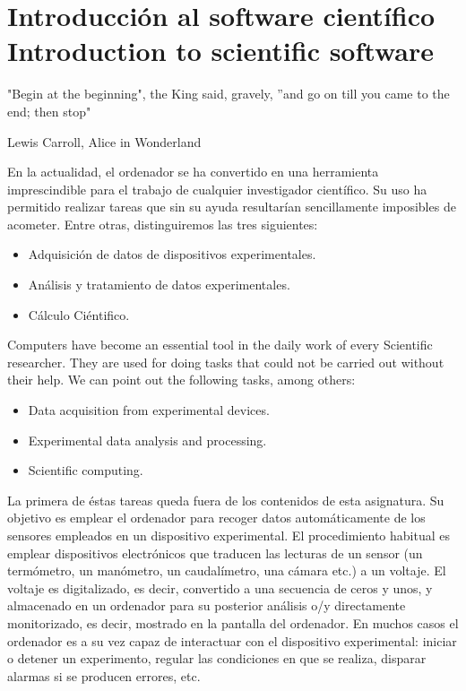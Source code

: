 \chapter{Introducción al software científico\\ Introduction to scientific software}\label{ch1}
\epigraph{"Begin at the beginning", the King said, gravely, ''and go on till you came to the end; then stop"}{Lewis Carroll, Alice in Wonderland}
\begin{paracol}{2}
En la actualidad, el ordenador se ha convertido en una herramienta imprescindible para el trabajo de cualquier investigador científico. Su uso ha permitido realizar tareas que sin su ayuda resultarían sencillamente imposibles de acometer. Entre otras, distinguiremos las tres siguientes:
\begin{itemize}
\item Adquisición de datos de dispositivos experimentales.
\item Análisis y tratamiento de datos experimentales. 
\item Cálculo Ciéntifico.
\end{itemize}
\switchcolumn
Computers have become an essential tool in the daily work of every Scientific researcher. They are used for doing tasks that could not be carried out without their help. We can point out the following tasks, among others:
 \begin{itemize}
\item Data acquisition from experimental devices.
\item Experimental data analysis and processing. 
\item Scientific computing.
\end{itemize}     


\switchcolumn
La primera de éstas tareas queda fuera de los contenidos de esta asignatura. Su objetivo es emplear el ordenador para recoger datos automáticamente de los sensores empleados en un dispositivo experimental. El procedimiento habitual es emplear dispositivos electrónicos que traducen las lecturas de un sensor (un termómetro, un manómetro, un caudalímetro, una cámara etc.) a un voltaje. El voltaje es digitalizado, es decir, convertido a una secuencia de ceros y unos, y almacenado en un ordenador para su posterior análisis o/y directamente monitorizado, es decir, mostrado en la pantalla del ordenador. En muchos casos el ordenador es a su vez capaz de interactuar con el dispositivo experimental: iniciar o detener un experimento, regular las condiciones en que se realiza, disparar alarmas si se producen errores, etc.


\end{paracol}
